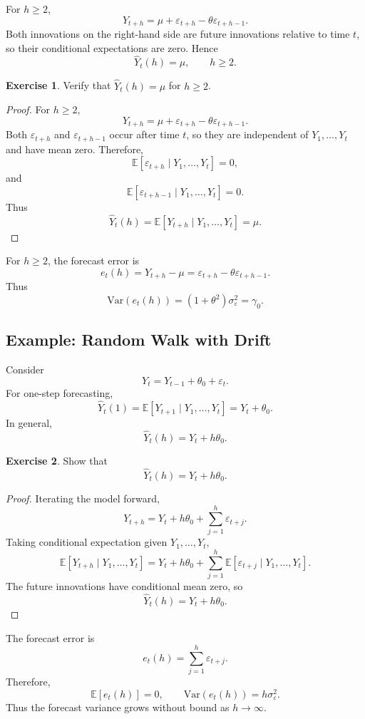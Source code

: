 \documentclass[12pt,oneside]{book}
\numberwithin{equation}{section}
\theoremstyle{definition}
\newtheorem{exercise}{Exercise}[section]
\theoremstyle{plain}
\theoremstyle{remark}
\newcommand{\E}{\mathbb{E}}
\newcommand{\Var}{\mathrm{Var}}
\begin{document}
For $h\geq 2$,
\[
Y_{t+h}=\mu+\varepsilon_{t+h}-\theta\varepsilon_{t+h-1}.
\]
Both innovations on the right-hand side are future innovations relative to time $t$, so their conditional expectations are zero. Hence
\[
\widehat{Y}_t(h)=\mu,
\qquad h\geq 2.
\]

\begin{exercise}
Verify that $\widehat{Y}_t(h)=\mu$ for $h\geq 2$.
\end{exercise}

\begin{proof}
For $h\geq 2$,
\[
Y_{t+h}
=
\mu+\varepsilon_{t+h}-\theta\varepsilon_{t+h-1}.
\]
Both $\varepsilon_{t+h}$ and $\varepsilon_{t+h-1}$ occur after time $t$, so they are independent of $Y_1,\ldots,Y_t$ and have mean zero. Therefore,
\[
\E[\varepsilon_{t+h}\mid Y_1,\ldots,Y_t]=0,
\]
and
\[
\E[\varepsilon_{t+h-1}\mid Y_1,\ldots,Y_t]=0.
\]
Thus
\[
\widehat{Y}_t(h)
=
\E[Y_{t+h}\mid Y_1,\ldots,Y_t]
=
\mu.
\]
\end{proof}

For $h\geq 2$, the forecast error is
\[
e_t(h)
=
Y_{t+h}-\mu
=
\varepsilon_{t+h}-\theta\varepsilon_{t+h-1}.
\]
Thus
\[
\Var(e_t(h))
=
(1+\theta^2)\sigma_\varepsilon^2
=
\gamma_0.
\]

\subsection*{Example: Random Walk with Drift}

Consider
\[
Y_t=Y_{t-1}+\theta_0+\varepsilon_t.
\]
For one-step forecasting,
\[
\widehat{Y}_t(1)
=
\E[Y_{t+1}\mid Y_1,\ldots,Y_t]
=
Y_t+\theta_0.
\]
In general,
\[
\widehat{Y}_t(h)=Y_t+h\theta_0.
\]

\begin{exercise}
Show that
\[
\widehat{Y}_t(h)=Y_t+h\theta_0.
\]
\end{exercise}

\begin{proof}
Iterating the model forward,
\[
Y_{t+h}
=
Y_t+h\theta_0+\sum_{j=1}^{h}\varepsilon_{t+j}.
\]
Taking conditional expectation given $Y_1,\ldots,Y_t$,
\[
\E[Y_{t+h}\mid Y_1,\ldots,Y_t]
=
Y_t+h\theta_0
+
\sum_{j=1}^{h}
\E[\varepsilon_{t+j}\mid Y_1,\ldots,Y_t].
\]
The future innovations have conditional mean zero, so
\[
\widehat{Y}_t(h)=Y_t+h\theta_0.
\]
\end{proof}

The forecast error is
\[
e_t(h)
=
\sum_{j=1}^{h}\varepsilon_{t+j}.
\]
Therefore,
\[
\E[e_t(h)]=0,
\qquad
\Var(e_t(h))=h\sigma_\varepsilon^2.
\]
Thus the forecast variance grows without bound as $h\to\infty$.
\end{document}
